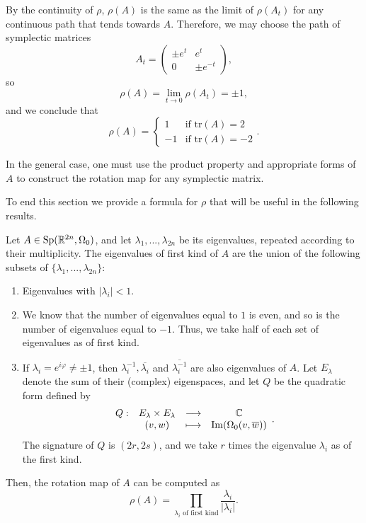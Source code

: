 \begin{enumerate}
	By the continuity of $\rho$, $\rho(A)$ is the same as the limit of $\rho(A_t)$ for any continuous path that tends towards $A$. Therefore, we may choose the path of symplectic matrices
	\[A_t = \begin{pmatrix} \pm e^t & e^t \\ 0 & \pm e^{-t} \end{pmatrix} ,\]
	so
	\[\rho(A) = \lim_{t \rightarrow 0} \rho(A_t) = \pm 1 ,\]
	and we conclude that
	\[\rho(A) = \left\{ \begin{array}{lc} 1 & \text{if tr}(A) = 2 \\ -1 & \text{if tr}(A) = -2 \end{array} \right. .\]
\end{enumerate}

In the general case, one must use the product property and appropriate forms of $A$ to construct the rotation map for any symplectic matrix.

To end this section we provide a formula for $\rho$ that will be useful in the following results.

\begin{lema} \label{rotationformula}
Let $A \in \text{Sp}(\mathbb{R}^{2n},\Omega_0)$, and let $\lambda_1,...,\lambda_{2n}$ be its eigenvalues, repeated according to their multiplicity. The eigenvalues of first kind of $A$ are the union of the following subsets of $\{\lambda_1,...,\lambda_{2n}\}$:
\begin{enumerate}
	\item Eigenvalues with $|\lambda_i| < 1$.
	\item We know that the number of eigenvalues equal to $1$ is even, and so is the number of eigenvalues equal to $-1$. Thus, we take half of each set of eigenvalues as of first kind.
	\item If $\lambda_i = e^{i \varphi} \neq \pm 1$, then $\lambda_i^{-1}, \overline{\lambda_i}$ and $\overline{\lambda_i^{-1}}$ are also eigenvalues of $A$. Let $E_{\lambda}$ denote the sum of their (complex) eigenspaces, and let $Q$ be the quadratic form defined by
	\[\begin{array}{rccc} Q : & E_{\lambda} \times E_{\lambda} & \longrightarrow & \mathbb{C} \\ & (v,w) & \longmapsto & \mathrm{Im}(\Omega_0(v,\overline{w})) \end{array} .\]
	The signature of $Q$ is $(2r,2s)$, and we take $r$ times the eigenvalue $\lambda_i$ as of the first kind.
\end{enumerate}

Then, the rotation map of $A$ can be computed as
\[\rho(A) = \prod_{\lambda_i \text{ of first kind}} \frac{\lambda_i}{|\lambda_i|} .\]
\end{lema}
